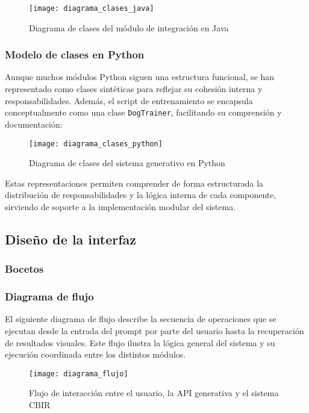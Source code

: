 \begin{figure}[H]
    \centering
    \texttt{[image: diagrama\_clases\_java]}
    \caption{Diagrama de clases del módulo de integración en Java}
    \label{fig:clases-java}
\end{figure}

\subsubsection{Modelo de clases en Python}

Aunque muchos módulos Python siguen una estructura funcional, se han representado como clases sintéticas para reflejar su cohesión interna y responsabilidades. Además, el script de entrenamiento se encapsula conceptualmente como una clase \texttt{DogTrainer}, facilitando su comprensión y documentación:

\begin{figure}[H]
    \centering
    \texttt{[image: diagrama\_clases\_python]}
    \caption{Diagrama de clases del sistema generativo en Python}
    \label{fig:clases-python}
\end{figure}

Estas representaciones permiten comprender de forma estructurada la distribución de responsabilidades y la lógica interna de cada componente, sirviendo de soporte a la implementación modular del sistema.


\subsection{Diseño de la interfaz}
\subsubsection{Bocetos}
\subsubsection{Diagrama de flujo}
El siguiente diagrama de flujo describe la secuencia de operaciones que se ejecutan desde la entrada del prompt por parte del usuario hasta la recuperación de resultados visuales. Este flujo ilustra la lógica general del sistema y su ejecución coordinada entre los distintos módulos.

\begin{figure}[H]
    \centering
    \texttt{[image: diagrama\_flujo]}
    \caption{Flujo de interacción entre el usuario, la API generativa y el sistema CBIR}
    \label{fig:flujo-interaccion}
\end{figure}

